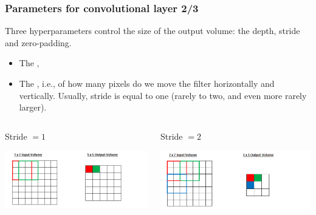 \begin{frame}
	\frametitle{Parameters for convolutional layer 2/3}

	Three hyperparameters control the size of the output volume: the depth, stride and zero-padding.

	\bigskip

	\begin{itemize}
		\item The ,

		\item The , i.e., of how many pixels do we move the filter horizontally and vertically. Usually, stride is equal to one (rarely to two, and even more rarely larger).
	\end{itemize}


	\begin{columns}[T] %
		\hspace{0.2cm}
		\begin{column}{.5\textwidth}
			Stride $=1$
			\begin{center}
				\includegraphics[scale=0.4]{figs/Stride1}
			\end{center}
		\end{column}%
		\vrule{}
		\hspace{0.2cm}
		\begin{column}{.5\textwidth}
			Stride $=2$
			\begin{center}
				\includegraphics[scale=0.4]{figs/Stride2}
			\end{center}
		\end{column}%
	\end{columns}

\end{frame}

